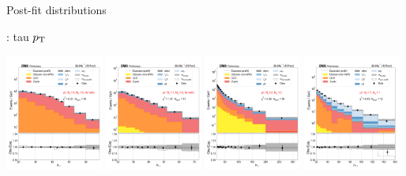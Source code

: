 \begin{frame}{}
Post-fit distributions
    \begin{tcolorbox}[colframe=NUpurple]{ \cmt: tau $p_{\mathrm{T}}$}
        \begin{center}
            \includegraphics[width=0.24\textwidth]{chapters/Analysis/sectionStatisticalAnalysis/figures/fit/mutau_cat_eq0_eq0}
            \includegraphics[width=0.24\textwidth]{chapters/Analysis/sectionStatisticalAnalysis/figures/fit/mutau_cat_eq1_eq0}
            \includegraphics[width=0.24\textwidth]{chapters/Analysis/sectionStatisticalAnalysis/figures/fit/mutau_cat_gt2_eq0}
            \includegraphics[width=0.24\textwidth]{chapters/Analysis/sectionStatisticalAnalysis/figures/fit/mutau_cat_eq1_eq1}


\end{center}
\end{tcolorbox}
\end{frame}
